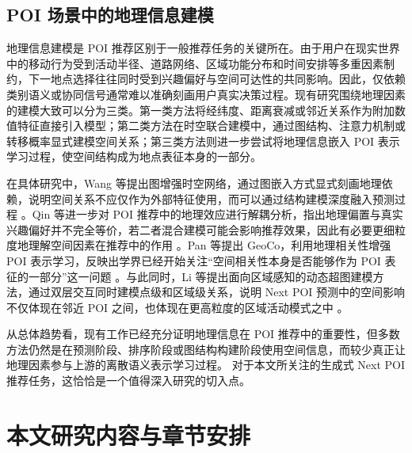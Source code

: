 
\subsection{POI 场景中的地理信息建模}

地理信息建模是 POI 推荐区别于一般推荐任务的关键所在。由于用户在现实世界中的移动行为受到活动半径、道路网络、区域功能分布和时间安排等多重因素制约，下一地点选择往往同时受到兴趣偏好与空间可达性的共同影响。因此，仅依赖类别语义或协同信号通常难以准确刻画用户真实决策过程。现有研究围绕地理因素的建模大致可以分为三类。第一类方法将经纬度、距离衰减或邻近关系作为附加数值特征直接引入模型；第二类方法在时空联合建模中，通过图结构、注意力机制或转移概率显式建模空间关系；第三类方法则进一步尝试将地理信息嵌入 POI 表示学习过程，使空间结构成为地点表征本身的一部分。

在具体研究中，Wang 等提出图增强时空网络，通过图嵌入方式显式刻画地理依赖，说明空间关系不应仅作为外部特征使用，而可以通过结构建模深度融入预测过程 \cite{wang2022graph}。Qin 等进一步对 POI 推荐中的地理效应进行解耦分析，指出地理偏置与真实兴趣偏好并不完全等价，若二者混合建模可能会影响推荐效果，因此有必要更细粒度地理解空间因素在推荐中的作用 \cite{qin2023disentanglegeo}。Pan 等提出 GeoCo，利用地理相关性增强 POI 表示学习，反映出学界已经开始关注“空间相关性本身是否能够作为 POI 表征的一部分”这一问题 \cite{pan2024geoco}。与此同时，Li 等提出面向区域感知的动态超图建模方法，通过双层交互同时建模点级和区域级关系，说明 Next POI 预测中的空间影响不仅体现在邻近 POI 之间，也体现在更高粒度的区域活动模式之中 \cite{li2025rehdm}。

从总体趋势看，现有工作已经充分证明地理信息在 POI 推荐中的重要性，但多数方法仍然是在预测阶段、排序阶段或图结构构建阶段使用空间信息，而较少真正让地理因素参与上游的离散语义表示学习过程。
对于本文所关注的生成式 Next POI 推荐任务，这恰恰是一个值得深入研究的切入点。

\section{本文研究内容与章节安排}
\label{sec:main_work}

